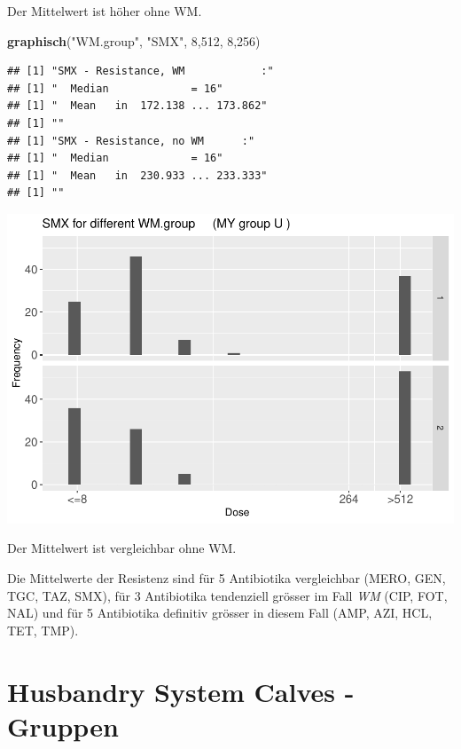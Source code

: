 \documentclass[
]{article}
\newenvironment{Shaded}{\begin{snugshade}}{\end{snugshade}}
\newcommand{\DecValTok}[1]{\textcolor[rgb]{0.00,0.00,0.81}{#1}}
\newcommand{\KeywordTok}[1]{\textcolor[rgb]{0.13,0.29,0.53}{\textbf{#1}}}
\newcommand{\NormalTok}[1]{#1}
\newcommand{\StringTok}[1]{\textcolor[rgb]{0.31,0.60,0.02}{#1}}
\begin{document}
Der Mittelwert ist höher ohne WM.

\begin{Shaded}
\begin{Highlighting}[]
  \KeywordTok{graphisch}\NormalTok{(}\StringTok{"WM.group"}\NormalTok{, }\StringTok{"SMX"}\NormalTok{, }\DecValTok{8}\NormalTok{,}\DecValTok{512}\NormalTok{, }\DecValTok{8}\NormalTok{,}\DecValTok{256}\NormalTok{) }
\end{Highlighting}
\end{Shaded}

\begin{verbatim}
## [1] "SMX - Resistance, WM            :"
## [1] "  Median             = 16"
## [1] "  Mean   in  172.138 ... 173.862"
## [1] ""
## [1] "SMX - Resistance, no WM      :"
## [1] "  Median             = 16"
## [1] "  Mean   in  230.933 ... 233.333"
## [1] ""
\end{verbatim}

\includegraphics{Verteilungen_files/figure-latex/unnamed-chunk-43-1.pdf}

Der Mittelwert ist vergleichbar ohne WM.

Die Mittelwerte der Resistenz sind für 5 Antibiotika vergleichbar (MERO,
GEN, TGC, TAZ, SMX), für 3 Antibiotika tendenziell grösser im Fall
\emph{WM} (CIP, FOT, NAL) und für 5 Antibiotika definitiv grösser in
diesem Fall (AMP, AZI, HCL, TET, TMP).

\hypertarget{husbandry-system-calves---gruppen}{%
\section{Husbandry System Calves -
Gruppen}\label{husbandry-system-calves---gruppen}}
\end{document}
